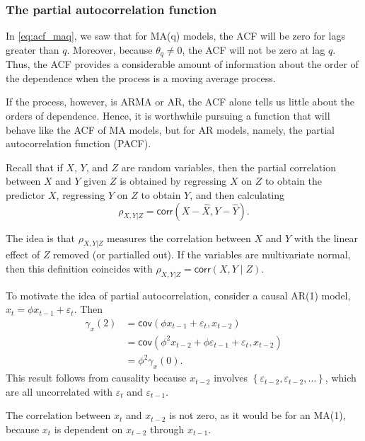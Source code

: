 \documentclass[
paper=128mm:96mm, %
fontsize=9.5pt, %
pagesize, %
parskip=half-, %
]{scrartcl} %
\theoremstyle{mythmstyle} %
\begin{document}
\subsubsection{The partial autocorrelation function}

In \eqref{eq:acf_maq}, we saw that for MA(q) models, the ACF will be zero for lags greater than $q$. Moreover, because $\theta_q\neq 0$, the ACF will not be zero at lag $q$. Thus, the ACF provides a considerable amount of information about the order of the dependence when the process is a moving average process.

If the process, however, is ARMA or AR, the ACF alone tells us little about the orders of dependence. Hence, it is worthwhile pursuing a function that will behave like the ACF of MA models, but for AR models, namely, the partial autocorrelation function (PACF).

Recall that if $X$, $Y$, and $Z$ are random variables, then the partial correlation between $X$ and $Y$ given $Z$ is obtained by regressing $X$ on $Z$ to obtain the predictor $X$, regressing $Y$ on $Z$ to obtain $Y$, and then calculating
%
\begin{equation}
\rho_{X,Y\vert Z}=\mathsf{corr}\left(X-\widehat{X},Y-\widehat{Y}\right).
\end{equation}
\clearpage

The idea is that $\rho_{X,Y\vert Z}$ measures the correlation between $X$ and $Y$ with the linear effect of $Z$ removed (or partialled out). If the variables are multivariate normal, then this definition coincides with $\rho_{X,Y\vert Z}=\mathsf{corr}\left(X,Y\mid Z\right)$.

To motivate the idea of partial autocorrelation, consider a causal AR(1) model, $x_t=\phi x_{t-1}+\varepsilon_t$. Then
%
\begin{align}
\gamma_{x}(2)&=\mathsf{cov}\left(\phi x_{t-1}+\varepsilon_t,x_{t-2}\right)\nonumber\\
&=\mathsf{cov}\left(\phi^2 x_{t-2}+\phi\varepsilon_{t-1}+\varepsilon_t,x_{t-2}\right)\nonumber\\
&=\phi^2\gamma_{x}(0).
\end{align}
%
This result follows from causality because $x_{t-2}$ involves $\left\{\varepsilon_{t-2},\varepsilon_{t-2},\dots\right\}$, which are all uncorrelated with $\varepsilon_{t}$ and $\varepsilon_{t-1}$. 

The correlation between $x_t$ and $x_{t-2}$ is not zero, as it would be for an MA(1), because $x_t$ is dependent on $x_{t-2}$ through $x_{t-1}$. 
\clearpage
\end{document}
